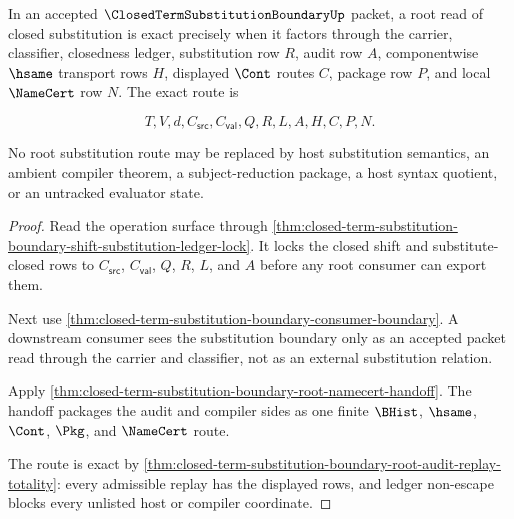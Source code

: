 \begin{theorem}
\label{thm:closed-term-substitution-boundary-root-substitution-route-exactness}
In an accepted $\ClosedTermSubstitutionBoundaryUp$ packet, a root read of closed substitution is exact precisely when it factors through the carrier, classifier, closedness ledger, substitution row $R$, audit row $A$, componentwise $\hsame$ transport rows $H$, displayed $\Cont$ routes $C$, package row $P$, and local $\NameCert$ row $N$. The exact route is

$$
T,V,d,C_{\mathsf{src}},C_{\mathsf{val}},Q,R,L,A,H,C,P,N.
$$

No root substitution route may be replaced by host substitution semantics, an ambient compiler theorem, a subject-reduction package, a host syntax quotient, or an untracked evaluator state.
\end{theorem}
\begin{proof}
Read the operation surface through \autoref{thm:closed-term-substitution-boundary-shift-substitution-ledger-lock}. It locks the closed shift and substitute-closed rows to $C_{\mathsf{src}}$, $C_{\mathsf{val}}$, $Q$, $R$, $L$, and $A$ before any root consumer can export them.

Next use \autoref{thm:closed-term-substitution-boundary-consumer-boundary}. A downstream consumer sees the substitution boundary only as an accepted packet read through the carrier and classifier, not as an external substitution relation.

Apply \autoref{thm:closed-term-substitution-boundary-root-namecert-handoff}. The handoff packages the audit and compiler sides as one finite $\BHist$, $\hsame$, $\Cont$, $\Pkg$, and $\NameCert$ route.

The route is exact by \autoref{thm:closed-term-substitution-boundary-root-audit-replay-totality}: every admissible replay has the displayed rows, and ledger non-escape blocks every unlisted host or compiler coordinate.
\end{proof}

